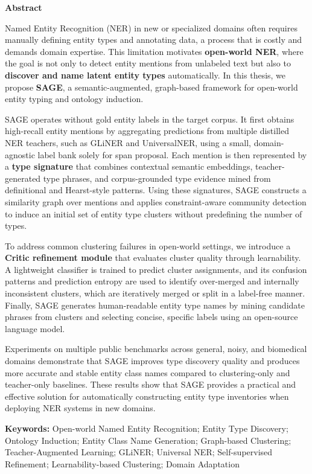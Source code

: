 \clearpage

\begin{center}
	\textbf{\large Abstract}
\end{center}

Named Entity Recognition (NER) in new or specialized domains often requires manually defining entity types and annotating data, a process that is costly and demands domain expertise. 
This limitation motivates \textbf{open-world NER}, where the goal is not only to detect entity mentions from unlabeled text but also to \textbf{discover and name latent entity types} automatically. 
In this thesis, we propose \textbf{SAGE}, a semantic-augmented, graph-based framework for open-world entity typing and ontology induction.

SAGE operates without gold entity labels in the target corpus. It first obtains high-recall entity mentions by aggregating predictions from multiple distilled NER teachers, 
such as GLiNER and UniversalNER, using a small, domain-agnostic label bank solely for span proposal. Each mention is then represented by a \textbf{type signature} that combines contextual semantic 
embeddings, teacher-generated type phrases, and corpus-grounded type evidence mined from definitional and Hearst-style patterns. Using these signatures, SAGE constructs a similarity graph over mentions and applies constraint-aware community detection to induce an initial set of entity type clusters without predefining the number of types.

To address common clustering failures in open-world settings, we introduce a \textbf{Critic refinement module} that evaluates cluster quality through learnability. 
A lightweight classifier is trained to predict cluster assignments, and its confusion patterns and prediction entropy are used to identify over-merged and internally inconsistent clusters, 
which are iteratively merged or split in a label-free manner. Finally, SAGE generates human-readable entity type names by mining candidate phrases from clusters and selecting concise, 
specific labels using an open-source language model.

Experiments on multiple public benchmarks across general, noisy, and biomedical domains demonstrate that SAGE improves type discovery quality and produces more accurate and 
stable entity class names compared to clustering-only and teacher-only baselines. These results show that SAGE provides a practical and effective solution 
for automatically constructing entity type inventories when deploying NER systems in new domains.


\vspace*{1cm}

\noindent\textbf{Keywords:} Open-world Named Entity Recognition; Entity Type Discovery; Ontology Induction; Entity Class Name Generation; Graph-based Clustering; Teacher-Augmented Learning; GLiNER; Universal NER; Self-supervised Refinement; Learnability-based Clustering; Domain Adaptation

